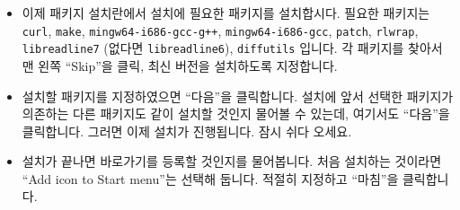 \begin{itemize}
\begin{figure}[t]
    \label{fig:cygwin}
    \caption{설치할 \CYGWIN{} 패키지 선택}
  \end{figure}
  가운데에는 많은 \CYGWIN{} 패키지 목록이 보입니다. 각 부분의 의미하는 바는
  다음과 같습니다.
  \begin{enumerate}
  \item 검색란입니다. 설치할 패키지 이름을 입력하면 패키지 목록이 걸러집니다.
  \item 이 버튼 중 하나를 클릭하면 패키지를 자동으로 선택합니다. ``Keep''은
    현재 \CYGWIN{} 시스템에 설치된 패키지를 그대로 유지한다는 의미입니다. 이를
    클릭하면 새로 패키지를 설치하거나 삭제하려고 선택한 사항은 모두
    취소됩니다. 그 옆의 ``Curr''은 현재 설치된 패키지 중 안정 버전으로 업데이트
    할 수 있는 것을 모두 선택하라는 의미입니다. ``Exp''은 ``Curr''과 비슷하지만
    단 안전성이 고려되지 않은 실험 버전의 패키지도 고려합니다.\footnote{여기서
      실험 버전이란 원 프로그램 개발 측(upstream)에서 실험 중이라는 것이
      아니라, 그 프로그램이 \CYGWIN{} 시스템에서 제대로 동작하는지를 \CYGWIN{}
      개발진에서 실험 중에 있다는 의미입니다. 따라서 실험 버전이어도 그것이 원
      프로그램의 최신 버전보다 옛 버전일 수도 있습니다.}
  \item 패키지 목록 형식을 지정하는 버튼입니다. 버튼을 누를 때마다
    가운데 패키지 목록이 바뀝니다. ``Pending''은 현재 설치 대상으로 지정된
    패키지만을 보여 줍니다. 설치할 패키지를 아무것도 지정하지 않더라도
    업데이트 혹은 \CYGWIN{}에 필요한 패키지가 자동으로 지정되어 있을 수도
    있습니다. ``Up To Date''는 현재 설치된 패키지 중 최신 버전의 패키지를,
    ``Not Installed''는 아직 설치되지 않은 패키지만을 보여
    줍니다. ``Category''는 패키지 목록 전체를 패키지 종류별로 분류하여,
    ``Full''은 일렬로 나열하여 보여줍니다.
  \item 패키지의 정보입니다. 맨 앞은 이번 설치 과정에서 해당 패키지를 어떻게
    다룰지를 설정하는 란입니다. 클릭하면 패키지를 설치 혹은 제거하도록 지정할
    수 있습니다. ``Skip''은 이 패키지를 설치하지 않을 것임을 나타냅니다. 그 외
    숫자는 설치할 패키지 버전 정보를 나타냅니다. 여러 버전이 있다면 계속
    클릭할 때마다 버전이 바뀝니다. 중간의 ``B'' 란은 바이너리 설치 여부, ``S''
    란은 소스 코드 설치 여부입니다. 이 항목은 크게 신경쓰지 않아도 됩니다.
  \end{enumerate}
\item 이제 패키지 설치란에서 \OCAML{} 설치에 필요한 패키지를
  설치합시다. 필요한 패키지는 \texttt{curl}, \texttt{make},
  \texttt{mingw64-i686-gcc-g++}, \texttt{mingw64-i686-gcc}, \texttt{patch},
  \texttt{rlwrap}, \texttt{libreadline7} (없다면 \texttt{libreadline6}), \texttt{diffutils} 입니다. 각
  패키지를 찾아서 맨 왼쪽 ``Skip''을 클릭, 최신 버전을 설치하도록
  지정합니다.
\item 설치할 패키지를 지정하였으면 ``다음''을 클릭합니다. 설치에 앞서 선택한
  패키지가 의존하는 다른 패키지도 같이 설치할 것인지 물어볼 수 있는데,
  여기서도 ``다음''을 클릭합니다. 그러면 이제 설치가 진행됩니다. 잠시 쉬다
  오세요.
\item 설치가 끝나면 바로가기를 등록할 것인지를 물어봅니다. 처음 설치하는
  것이라면 ``Add icon to Start menu''는 선택해 둡니다. 적절히 지정하고
  ``마침''을 클릭합니다.
\end{itemize}

